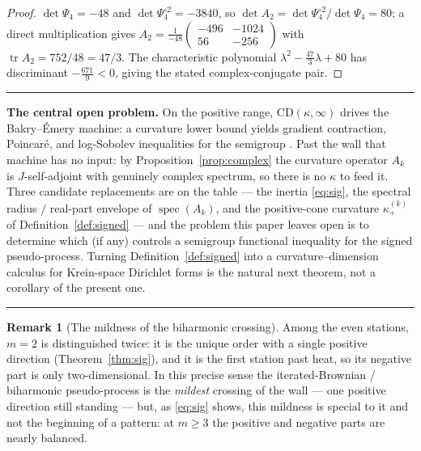 \documentclass[11pt,reqno]{amsart}
\theoremstyle{plain}
\theoremstyle{definition}
\newtheorem{remark}[theorem]{Remark}
\newenvironment{ledger}
  {\par\medskip\noindent\rule{\linewidth}{0.4pt}\par\nopagebreak\smallskip\small}
  {\par\nopagebreak\smallskip\noindent\rule{\linewidth}{0.4pt}\par\medskip}
\newcommand{\Had}{\mathbin{\circ}}
\DeclareMathOperator{\spec}{spec}
\DeclareMathOperator{\tr}{tr}
\begin{document}
\begin{proof}
$\det\Psi_4=-48$ and $\det\Psi_4^{\Had2}=-3840$, so $\det A_2=\det\Psi_4^{\Had2}/
\det\Psi_4=80$; a direct multiplication gives
$A_2=\tfrac1{-48}\left(\begin{smallmatrix}-496&-1024\\56&-256\end{smallmatrix}\right)$
with $\tr A_2=752/48=47/3$. The characteristic polynomial
$\lambda^{2}-\tfrac{47}{3}\lambda+80$ has discriminant $-\tfrac{671}{9}<0$, giving
the stated complex-conjugate pair.
\end{proof}

\begin{ledger}
\noindent\textbf{The central open problem.}
On the positive range, $\mathrm{CD}(\kappa,\infty)$ drives the Bakry--\'Emery
machine: a curvature lower bound yields gradient contraction, Poincar\'e, and
log-Sobolev inequalities for the semigroup \cite{BGL}. Past the wall that machine
has no input: by Proposition~\ref{prop:complex} the curvature operator $A_k$ is
$J$-self-adjoint with genuinely complex spectrum, so there is no $\kappa$ to feed
it. Three candidate replacements are on the table --- the inertia
\eqref{eq:sig}, the spectral radius / real-part envelope of $\spec(A_k)$, and the
positive-cone curvature $\kappa_+^{(k)}$ of Definition~\ref{def:signed} --- and the
problem this paper leaves open is to determine which (if any) controls a
semigroup functional inequality for the signed pseudo-process. Turning
Definition~\ref{def:signed} into a curvature--dimension calculus for Krein-space
Dirichlet forms is the natural next theorem, not a corollary of the present one.
\end{ledger}

\begin{remark}[The mildness of the biharmonic crossing]
Among the even stations, $m=2$ is distinguished twice: it is the unique order with
a single positive direction (Theorem~\ref{thm:sig}), and it is the first station
past heat, so its negative part is only two-dimensional. In this precise sense the
iterated-Brownian / biharmonic pseudo-process is the \emph{mildest} crossing of
the wall --- one positive direction still standing --- but, as
\eqref{eq:sig} shows, this mildness is special to it and not the beginning of a
pattern: at $m\ge3$ the positive and negative parts are nearly balanced.
\end{remark}

\end{document}

